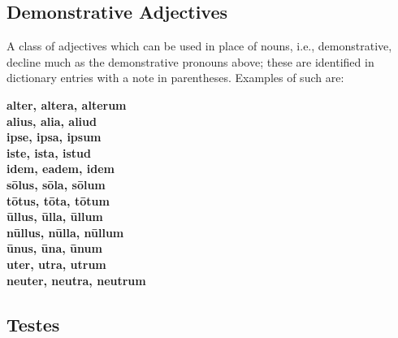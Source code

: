 \subsection{Demonstrative Adjectives}
A class of adjectives which can be used in place of nouns,
i.e., demonstrative, decline much as the demonstrative
pronouns above; these are identified in dictionary entries
with a note in parentheses.  Examples of such are:
\begin{multicols}{3}
  \setlength{\columnseprule}{0pt}
  \textbf{
  alter, altera, alterum \\
  alius, alia, aliud \\
  ipse, ipsa, ipsum \\
  iste, ista, istud \\ \vfill\null\columnbreak
  idem, eadem, idem \\
  s\=olus, s\=ola, s\=olum \\
  t\=otus, t\=ota, t\=otum \\
  \=ullus, \=ulla, \=ullum \\ \vfill\null\columnbreak
  n\=ullus, n\=ulla, n\=ullum \\
  \=unus, \=una, \=unum \\
  uter, utra, utrum \\
  neuter, neutra, neutrum \\ \vfill\null\columnbreak
  }
\end{multicols}
\subsection{Testes}
